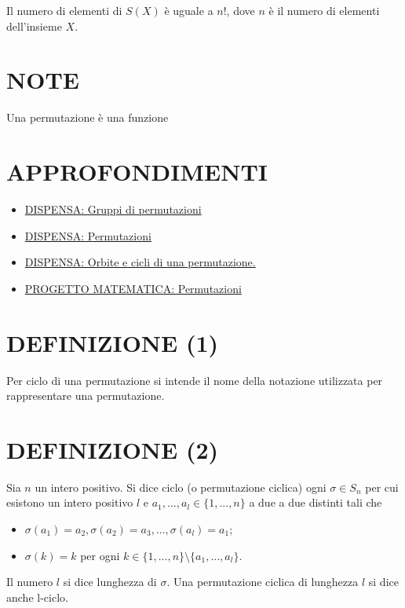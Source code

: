 Il numero di elementi di $S(X)$ è uguale a $n!$, dove $n$ è il numero di elementi dell'insieme $X$.

\section{NOTE}
Una permutazione è una funzione

\section{APPROFONDIMENTI}
\begin{itemize}
 \item \href{./pdf/PERMUTAZIONE/lezione4.pdf}{DISPENSA: Gruppi di permutazioni} \cite{permutazione1}
 \item \href{./pdf/PERMUTAZIONE/permutazioni.pdf}{DISPENSA: Permutazioni} \cite{permutazione2}
 \item \href{http://www.dm.uniba.it/~barile/Rete4/algebra1_pdf/lezione18.pdf}{DISPENSA: Orbite e cicli di una permutazione.} \cite{permutazione4}
 \item \href{http://progettomatematica.dm.unibo.it/Permutazioni/homepg.htm}{PROGETTO MATEMATICA: Permutazioni} \cite{permutazione3}
\end{itemize}

\section{DEFINIZIONE (1)}
Per ciclo di una permutazione si intende il nome della notazione utilizzata per rappresentare una permutazione.

\section{DEFINIZIONE (2)}
Sia $n$ un intero positivo. Si dice ciclo (o permutazione ciclica) ogni $\sigma \in S_n$ per cui esistono un intero
positivo $l$ e $a_1, ..., a_l \in \{1, ..., n\}$ a due a due distinti tali che
\begin{itemize}
 \item $\sigma(a_1)=a_2, \sigma(a_2)=a_3, ..., \sigma(a_l)=a_1$;
 \item $\sigma(k)=k$ per ogni $k \in \{1, ..., n\} \setminus \{a_1, ..., a_l\}$.
\end{itemize}
Il numero $l$ si dice lunghezza di $\sigma$. Una permutazione ciclica di lunghezza $l$ si dice anche l-ciclo.


